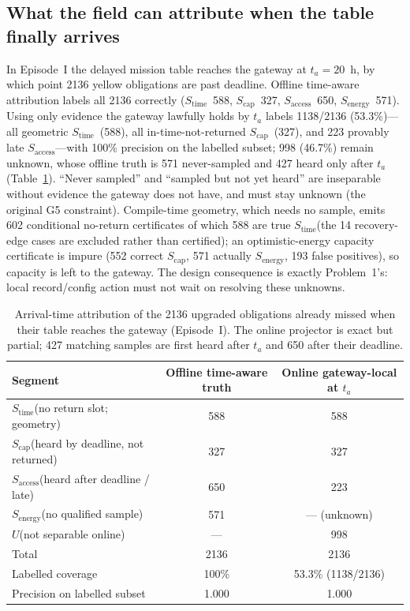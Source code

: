 \documentclass[11pt]{article}
\newcommand{\stime}{$S_{\mathrm{time}}$\xspace}
\newcommand{\scap}{$S_{\mathrm{cap}}$\xspace}
\newcommand{\senergy}{$S_{\mathrm{energy}}$\xspace}
\newcommand{\saccess}{$S_{\mathrm{access}}$\xspace}
\newcommand{\unk}{$U$\xspace}
\begin{document}
\subsection{What the field can attribute when the table finally arrives}
\label{sec:eval-attr}
In Episode~I the delayed mission table reaches the gateway at $t_a{=}20$~h, by which point 2136
yellow obligations are past deadline. Offline time-aware attribution labels all 2136 correctly
(\stime\ 588, \scap\ 327, \saccess\ 650, \senergy\ 571). Using only evidence the gateway lawfully
holds by $t_a$ labels 1138/2136 (53.3\%)---all geometric \stime\ (588), all in-time-not-returned
\scap\ (327), and 223 provably late \saccess---with 100\% precision on the labelled subset; 998
(46.7\%) remain unknown, whose offline truth is 571 never-sampled and 427 heard only after $t_a$
(Table~\ref{tab:attribution}). ``Never sampled'' and ``sampled but not yet heard'' are inseparable
without evidence the gateway does not have, and must stay unknown (the original G5 constraint).
Compile-time geometry, which needs no sample, emits 602 conditional no-return certificates of which
588 are true \stime (the 14 recovery-edge cases are excluded rather than certified); an
optimistic-energy capacity certificate is impure (552 correct \scap, 571 actually \senergy, 193
false positives), so capacity is left to the gateway. The design consequence is exactly
Problem~1's: local record/config action must not wait on resolving these unknowns.

\begin{table}[h]
\centering\small
\begin{tabular}{lcc}
\toprule
Segment & Offline time-aware truth & Online gateway-local at $t_a$\\
\midrule
\stime (no return slot; geometry) & 588 & 588\\
\scap (heard by deadline, not returned) & 327 & 327\\
\saccess (heard after deadline / late) & 650 & 223\\
\senergy (no qualified sample) & 571 & --- (unknown)\\
\unk (not separable online) & --- & 998\\
\midrule
Total & 2136 & 2136\\
Labelled coverage & 100\% & 53.3\% (1138/2136)\\
Precision on labelled subset & 1.000 & 1.000\\
\bottomrule
\end{tabular}
\caption{Arrival-time attribution of the 2136 upgraded obligations already missed when their table
reaches the gateway (Episode~I). The online projector is exact but partial; 427 matching samples
are first heard after $t_a$ and 650 after their deadline.}
\label{tab:attribution}
\end{table}
\end{document}
